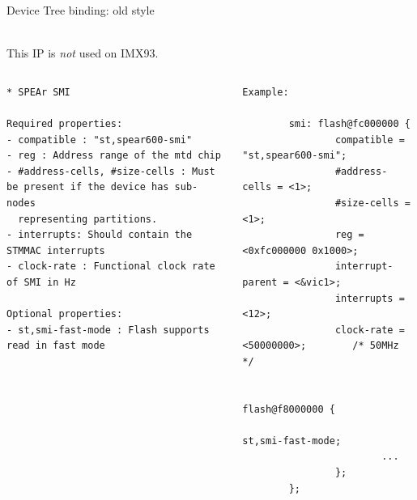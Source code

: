 \begin{frame}[fragile]{Device Tree binding: old style}
  \begin{center}
    \\
    This IP is {\em not} used on IMX93.
  \end{center}
  \begin{columns}[t]
    \begin{block}{}
      {\fontsize{5}{6}\selectfont
\begin{verbatim}
* SPEAr SMI

Required properties:
- compatible : "st,spear600-smi"
- reg : Address range of the mtd chip
- #address-cells, #size-cells : Must be present if the device has sub-nodes
  representing partitions.
- interrupts: Should contain the STMMAC interrupts
- clock-rate : Functional clock rate of SMI in Hz

Optional properties:
- st,smi-fast-mode : Flash supports read in fast mode

\end{verbatim}
      }
    \end{block}
    \begin{block}{}
      {\fontsize{4}{5}\selectfont
\begin{verbatim}
Example:

        smi: flash@fc000000 {
                compatible = "st,spear600-smi";
                #address-cells = <1>;
                #size-cells = <1>;
                reg = <0xfc000000 0x1000>;
                interrupt-parent = <&vic1>;
                interrupts = <12>;
                clock-rate = <50000000>;        /* 50MHz */

                flash@f8000000 {
                        st,smi-fast-mode;
                        ...
                };
        };
\end{verbatim}
      }
    \end{block}
  \end{columns}

\end{frame}


